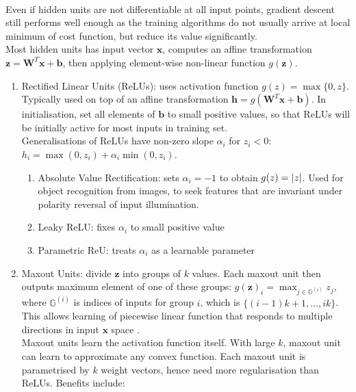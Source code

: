 \begin{definition} \\
Even if hidden units are not differentiable at all input points, gradient descent still performs well enough as the training algorithms do not usually arrive at local minimum of cost function, but reduce its value significantly.\\
Most hidden units has input vector $\bm{x}$, computes an affine transformation $\bm{z} = \bm{W}^T \bm{x} + \bm{b}$, then applying element-wise non-linear function $g(\bm{z})$.
\begin{enumerate}[label=\roman*.]
\setlength{\itemsep}{0pt}
\item Rectified Linear Units (ReLUs): uses activation function $g(z) = \max \{0, z\}$.\\
Typically used on top of an affine transformation $\bm{h} = g(\bm{W}^T \bm{x} + \bm{b})$. In initialisation, set all elements of $\bm{b}$ to small positive values, so that ReLUs will be initially active for most inputs in training set.\\
Generalisations of ReLUs have non-zero slope $\alpha_i$ for $z_i < 0$: $h_i = \max(0, z_i) + \alpha_i \min(0, z_i)$.
\begin{enumerate}[label=\arabic*.]
\setlength{\itemsep}{0pt}
\item Absolute Value Rectification: sets $\alpha_i = -1$ to obtain $g(z) = \left\lvert z\right\rvert$. Used for object recognition from images, to seek features that are invariant under polarity reversal of input illumination.
\item Leaky ReLU: fixes $\alpha_i$ to small positive value
\item Parametric ReU: treats $\alpha_i$ as a learnable parameter
\end{enumerate}
\item Maxout Units: divide $\bm{z}$ into groups of $k$ values. Each maxout unit then outputs maximum element of one of these groups: $g(\bm{z})_i = \max_{j \in \mathbb{G}^{(i)}} z_j$, where $\mathbb{G}^{(i)}$ is indices of inputs for group $i$, which is $\{(i-1)k + 1, \ldots, ik\}$.\\
This allows learning of piecewise linear function that responds to multiple directions in input $\bm{x}$ space .\\
Maxout units learn the activation function itself. With large $k$, maxout unit can learn to approximate any convex function. Each maxout unit is parametrised by $k$ weight vectors, hence need more regularisation than ReLUs. Benefits include:

\end{enumerate}
\end{definition}
